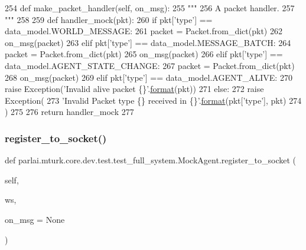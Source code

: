 \begin{DoxyCode}
254     \textcolor{keyword}{def }make\_packet\_handler(self, on\_msg):
255         \textcolor{stringliteral}{"""}
256 \textcolor{stringliteral}{        A packet handler.}
257 \textcolor{stringliteral}{        """}
258 
259         \textcolor{keyword}{def }handler\_mock(pkt):
260             \textcolor{keywordflow}{if} pkt[\textcolor{stringliteral}{'type'}] == data\_model.WORLD\_MESSAGE:
261                 packet = Packet.from\_dict(pkt)
262                 on\_msg(packet)
263             \textcolor{keywordflow}{elif} pkt[\textcolor{stringliteral}{'type'}] == data\_model.MESSAGE\_BATCH:
264                 packet = Packet.from\_dict(pkt)
265                 on\_msg(packet)
266             \textcolor{keywordflow}{elif} pkt[\textcolor{stringliteral}{'type'}] == data\_model.AGENT\_STATE\_CHANGE:
267                 packet = Packet.from\_dict(pkt)
268                 on\_msg(packet)
269             \textcolor{keywordflow}{elif} pkt[\textcolor{stringliteral}{'type'}] == data\_model.AGENT\_ALIVE:
270                 \textcolor{keywordflow}{raise} Exception(\textcolor{stringliteral}{'Invalid alive packet \{\}'}.\hyperlink{namespaceparlai_1_1chat__service_1_1services_1_1messenger_1_1shared__utils_a32e2e2022b824fbaf80c747160b52a76}{format}(pkt))
271             \textcolor{keywordflow}{else}:
272                 \textcolor{keywordflow}{raise} Exception(
273                     \textcolor{stringliteral}{'Invalid Packet type \{\} received in \{\}'}.\hyperlink{namespaceparlai_1_1chat__service_1_1services_1_1messenger_1_1shared__utils_a32e2e2022b824fbaf80c747160b52a76}{format}(pkt[\textcolor{stringliteral}{'type'}], pkt)
274                 )
275 
276         \textcolor{keywordflow}{return} handler\_mock
277 
\end{DoxyCode}
\mbox{\label{classparlai_1_1mturk_1_1core_1_1dev_1_1test_1_1test__full__system_1_1MockAgent_a97d5a5cb8bf72c4a294e51e0cf275911}} 
\subsubsection{\texorpdfstring{register\+\_\+to\+\_\+socket()}{register\_to\_socket()}}
{\footnotesize\ttfamily def parlai.\+mturk.\+core.\+dev.\+test.\+test\+\_\+full\+\_\+system.\+Mock\+Agent.\+register\+\_\+to\+\_\+socket (\begin{DoxyParamCaption}\item[{}]{self,  }\item[{}]{ws,  }\item[{}]{on\+\_\+msg = {\ttfamily None} }\end{DoxyParamCaption})}



